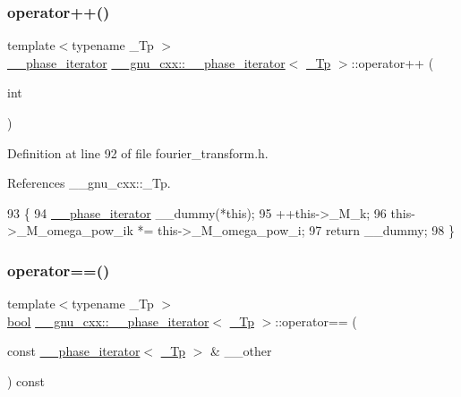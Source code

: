 \subsubsection{\texorpdfstring{operator++()}{operator++()}\hspace{0.1cm}{\footnotesize\ttfamily [2/2]}}
{\footnotesize\ttfamily template$<$typename \+\_\+\+Tp $>$ \\
\hyperlink{class____gnu__cxx_1_1____phase__iterator}{\+\_\+\+\_\+phase\+\_\+iterator} \hyperlink{class____gnu__cxx_1_1____phase__iterator}{\+\_\+\+\_\+gnu\+\_\+cxx\+::\+\_\+\+\_\+phase\+\_\+iterator}$<$ \hyperlink{namespace____gnu__cxx_a3b19a9c800ca194374ef9172290f7d79}{\+\_\+\+Tp} $>$\+::operator++ (\begin{DoxyParamCaption}\item[{int}]{ }\end{DoxyParamCaption})\hspace{0.3cm}{\ttfamily [inline]}}



Definition at line 92 of file fourier\+\_\+transform.\+h.



References \+\_\+\+\_\+gnu\+\_\+cxx\+::\+\_\+\+Tp.


\begin{DoxyCode}
93       \{
94         \hyperlink{class____gnu__cxx_1_1____phase__iterator_af39f5fc7df3ea01a383f9bc7345b2330}{\_\_phase\_iterator} \_\_dummy(*\textcolor{keyword}{this});
95         ++this->\_M\_k;
96         this->\_M\_omega\_pow\_ik *= this->\_M\_omega\_pow\_i;
97         \textcolor{keywordflow}{return} \_\_dummy;
98       \}
\end{DoxyCode}
\mbox{\label{class____gnu__cxx_1_1____phase__iterator_a8c60a48f50a1646d06c54507ddd6c2b2}} 
\subsubsection{\texorpdfstring{operator==()}{operator==()}}
{\footnotesize\ttfamily template$<$typename \+\_\+\+Tp $>$ \\
\hyperlink{namespace____gnu__cxx_ae83aca57f97767d5d09188718728a0ac}{bool} \hyperlink{class____gnu__cxx_1_1____phase__iterator}{\+\_\+\+\_\+gnu\+\_\+cxx\+::\+\_\+\+\_\+phase\+\_\+iterator}$<$ \hyperlink{namespace____gnu__cxx_a3b19a9c800ca194374ef9172290f7d79}{\+\_\+\+Tp} $>$\+::operator== (\begin{DoxyParamCaption}\item[{const \hyperlink{class____gnu__cxx_1_1____phase__iterator}{\+\_\+\+\_\+phase\+\_\+iterator}$<$ \hyperlink{namespace____gnu__cxx_a3b19a9c800ca194374ef9172290f7d79}{\+\_\+\+Tp} $>$ \&}]{\+\_\+\+\_\+other }\end{DoxyParamCaption}) const\hspace{0.3cm}{\ttfamily [inline]}}



